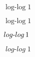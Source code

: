 \documentclass[11pt]{article}
\begin{document}

% 
% 

$\operatorname{log-log} 1$

$\mathit{\operatorname{log-log}} 1$

$\operatorname{\mathnormal{log-log}} 1$

$\operatorname{\mathit{log-log}} 1$
\end{document}
